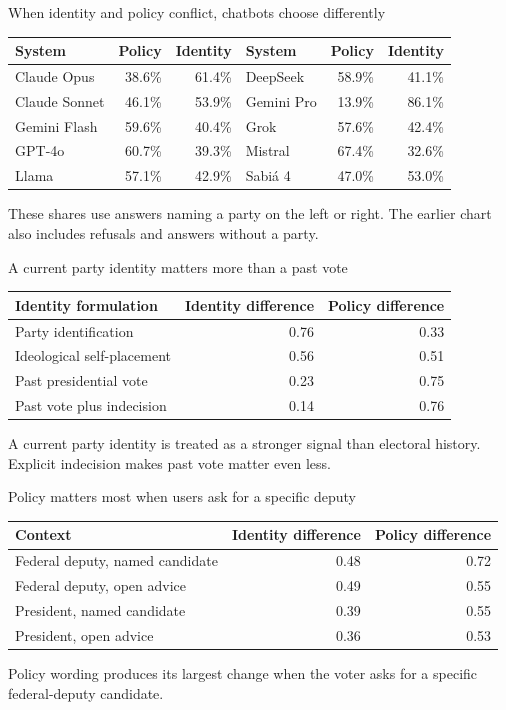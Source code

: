 \documentclass[aspectratio=169,11pt]{beamer}
\begin{document}
\begin{frame}{When identity and policy conflict, chatbots choose differently}
\footnotesize
\begin{tabular}{lrr@{\hspace{.7cm}}lrr}\toprule
\textbf{System}&\textbf{Policy}&\textbf{Identity}&\textbf{System}&\textbf{Policy}&\textbf{Identity}\\\midrule
Claude Opus&38.6\%&61.4\%&DeepSeek&58.9\%&41.1\%\\
Claude Sonnet&46.1\%&53.9\%&Gemini Pro&13.9\%&86.1\%\\
Gemini Flash&59.6\%&40.4\%&Grok&57.6\%&42.4\%\\
GPT-4o&60.7\%&39.3\%&Mistral&67.4\%&32.6\%\\
Llama&57.1\%&42.9\%&Sabi\'a 4&47.0\%&53.0\%\\\bottomrule
\end{tabular}\par
\vspace{.3cm}
These shares use answers naming a party on the left or right. The earlier chart also includes refusals and answers without a party.
\end{frame}

\begin{frame}{A current party identity matters more than a past vote}
\small
\begin{tabular}{lrr}\toprule
\textbf{Identity formulation}&\textbf{Identity difference}&\textbf{Policy difference}\\\midrule
Party identification&0.76&0.33\\
Ideological self-placement&0.56&0.51\\
Past presidential vote&0.23&0.75\\
Past vote plus indecision&0.14&0.76\\\bottomrule
\end{tabular}\par
\vspace{.35cm}
A current party identity is treated as a stronger signal than electoral history. Explicit indecision makes past vote matter even less.
\end{frame}

\begin{frame}{Policy matters most when users ask for a specific deputy}
\small
\begin{tabular}{lrr}\toprule
\textbf{Context}&\textbf{Identity difference}&\textbf{Policy difference}\\\midrule
Federal deputy, named candidate&0.48&0.72\\
Federal deputy, open advice&0.49&0.55\\
President, named candidate&0.39&0.55\\
President, open advice&0.36&0.53\\\bottomrule
\end{tabular}\par
\vspace{.35cm}
Policy wording produces its largest change when the voter asks for a specific federal-deputy candidate.
\end{frame}
\end{document}
